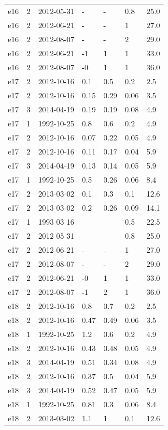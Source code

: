 \begin{table*}[htp]
\begin{tabular}{llll}
e16 & 2 & 2012-05-31 & - & - & 0.8 & 25.0 \\
e16 & 2 & 2012-06-21 & - & - & 1 & 27.0 \\
e16 & 2 & 2012-08-07 & - & - & 2 & 29.0 \\
e16 & 2 & 2012-06-21 & -1 & 1 & 1 & 33.0 \\
e16 & 2 & 2012-08-07 & -0 & 1 & 1 & 36.0 \\
e17 & 2 & 2012-10-16 & 0.1 & 0.5 & 0.2 & 2.5 \\
e17 & 2 & 2012-10-16 & 0.15 & 0.29 & 0.06 & 3.5 \\
e17 & 3 & 2014-04-19 & 0.19 & 0.19 & 0.08 & 4.9 \\
e17 & 1 & 1992-10-25 & 0.8 & 0.6 & 0.2 & 4.9 \\
e17 & 2 & 2012-10-16 & 0.07 & 0.22 & 0.05 & 4.9 \\
e17 & 2 & 2012-10-16 & 0.11 & 0.17 & 0.04 & 5.9 \\
e17 & 3 & 2014-04-19 & 0.13 & 0.14 & 0.05 & 5.9 \\
e17 & 1 & 1992-10-25 & 0.5 & 0.26 & 0.06 & 8.4 \\
e17 & 2 & 2013-03-02 & 0.1 & 0.3 & 0.1 & 12.6 \\
e17 & 2 & 2013-03-02 & 0.2 & 0.26 & 0.09 & 14.1 \\
e17 & 1 & 1993-03-16 & - & - & 0.5 & 22.5 \\
e17 & 2 & 2012-05-31 & - & - & 0.8 & 25.0 \\
e17 & 2 & 2012-06-21 & - & - & 1 & 27.0 \\
e17 & 2 & 2012-08-07 & - & - & 2 & 29.0 \\
e17 & 2 & 2012-06-21 & -0 & 1 & 1 & 33.0 \\
e17 & 2 & 2012-08-07 & -1 & 2 & 1 & 36.0 \\
e18 & 2 & 2012-10-16 & 0.8 & 0.7 & 0.2 & 2.5 \\
e18 & 2 & 2012-10-16 & 0.47 & 0.49 & 0.06 & 3.5 \\
e18 & 1 & 1992-10-25 & 1.2 & 0.6 & 0.2 & 4.9 \\
e18 & 2 & 2012-10-16 & 0.43 & 0.48 & 0.05 & 4.9 \\
e18 & 3 & 2014-04-19 & 0.51 & 0.34 & 0.08 & 4.9 \\
e18 & 2 & 2012-10-16 & 0.37 & 0.5 & 0.04 & 5.9 \\
e18 & 3 & 2014-04-19 & 0.52 & 0.47 & 0.05 & 5.9 \\
e18 & 1 & 1992-10-25 & 0.81 & 0.3 & 0.06 & 8.4 \\
e18 & 2 & 2013-03-02 & 1.1 & 1 & 0.1 & 12.6 \\

\end{tabular}
\end{table*}
